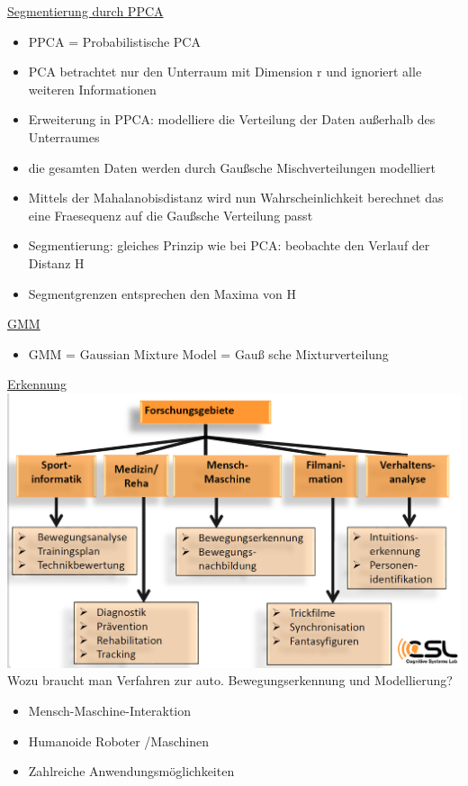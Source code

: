 \documentclass[a4paper,10pt,oneside]{article}
\begin{document}
\underline{Segmentierung durch PPCA} \\ 		
 	\begin{itemize}
 		\item PPCA = Probabilistische PCA
 		\item PCA betrachtet nur den Unterraum mit Dimension r und ignoriert alle weiteren Informationen
 		\item Erweiterung in PPCA: modelliere die Verteilung der Daten außerhalb des Unterraumes
 		\item die gesamten Daten werden durch Gaußsche Mischverteilungen modelliert
 		\item Mittels der Mahalanobisdistanz wird nun Wahrscheinlichkeit berechnet das eine Fraesequenz auf die Gaußsche Verteilung passt
 		\item Segmentierung: gleiches Prinzip wie bei PCA: beobachte den Verlauf der Distanz H
 		\item Segmentgrenzen entsprechen den Maxima von H
 	\end{itemize}

\underline{GMM} \\
	\begin{itemize}
		\item GMM = Gaussian Mixture Model = Gauß sche Mixturverteilung
	\end{itemize}
 		
 		
\underline{Erkennung} \\
\includegraphics[scale=0.2]{Grafiken/2326.png}
Wozu braucht man Verfahren zur auto. Bewegungserkennung und Modellierung?
	\begin{itemize}
		\item Mensch-Maschine-Interaktion
		\item Humanoide Roboter /Maschinen 
		\item Zahlreiche Anwendungsmöglichkeiten
	\end{itemize}	 	
	
\end{document}
